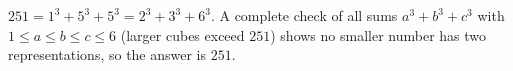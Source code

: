 $251=1^3+5^3+5^3=2^3+3^3+6^3$. A complete check of all sums $a^3+b^3+c^3$ with $1\le a\le b\le c\le6$ (larger cubes exceed $251$) shows no smaller number has two representations, so the answer is $\boxed{251}$.
